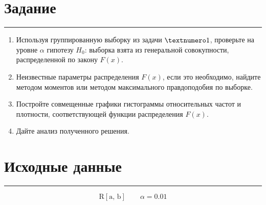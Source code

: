 \documentclass[a4paper, 14pt]{extarticle}
\begin{document}
\lstset{style=mystyle, extendedchars=\true}


\section*{Задание}\vspace{-20pt}\rule{\linewidth}{0.1mm}

\begin{enumerate}
    \item Используя группированную выборку из задачи $\textnumero 1$, проверьте на уровне $\alpha$ гипотезу $H_0$: выборка взята из генеральной совокупности, распределенной по закону $F(x)$.
    \item Неизвестные параметры распределения $F(x)$, если это необходимо, найдите методом моментов или методом максимального правдоподобия по выборке.
    \item Постройте совмещенные графики гистограммы относительных частот и плотности, соответствующей функции распределения $F(x)$.
    \item Дайте анализ полученного решения.
\end{enumerate}

\section*{Исходные данные}\vspace{-20pt}\rule{\linewidth}{0.1mm}

\begin{equation*}
    \text{R}[\text{a, b}] \qquad \alpha = 0.01
\end{equation*}

\vspace{-20pt}
\end{document}
